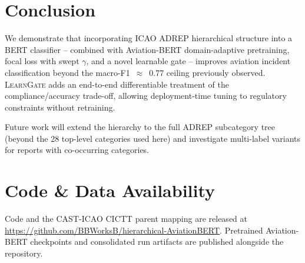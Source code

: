 \documentclass{article}
\newcommand{\modD}{\textsc{LearnGate}}
\begin{document}
\section{Conclusion}

We demonstrate that incorporating ICAO ADREP hierarchical structure
into a BERT classifier -- combined with Aviation-BERT domain-adaptive
pretraining, focal loss with swept $\gamma$, and a novel learnable
gate -- improves aviation incident classification beyond the
macro-F1~$\approx$~0.77 ceiling previously observed.
\modD{} adds an end-to-end differentiable treatment of the
compliance/accuracy trade-off, allowing deployment-time tuning to
regulatory constraints without retraining.

Future work will extend the hierarchy to the full ADREP subcategory
tree (beyond the 28 top-level categories used here) and investigate
multi-label variants for reports with co-occurring categories.




\section*{Code \& Data Availability}

Code and the CAST-ICAO CICTT parent mapping are released at
\url{https://github.com/BBWorksB/hierarchical-AviationBERT}.
Pretrained Aviation-BERT checkpoints and consolidated run artifacts
are published alongside the repository.
\end{document}
